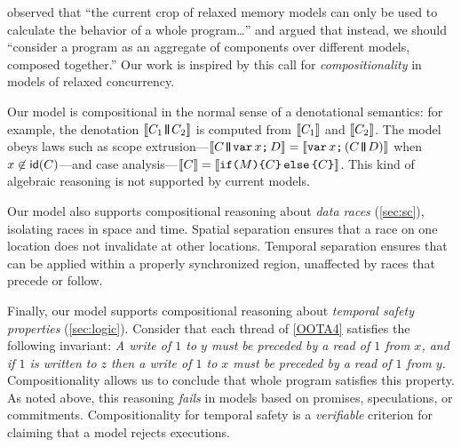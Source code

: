 \citet{Batty17} observed that ``the current crop of relaxed memory models can
only be used to calculate the behavior of a whole program\ldots'' and argued
that instead, we should ``consider a program as an aggregate of components
over different models, composed together.''  Our work is inspired by this
call for \emph{compositionality} in models of relaxed concurrency.

Our model is compositional in the normal sense of a denotational semantics:
for example, the denotation $\sem{C_1\!{\PAR}\! C_2}$ is computed from
$\llbracket C_1\rrbracket$ and $\llbracket C_2\rrbracket$.  The model obeys laws such as scope
extrusion---$\sem{\aCmd\!{\PAR}\! \VAR\aLoc\SEMI\bCmd} =
\sem{\VAR\aLoc\SEMI(\aCmd\!{\PAR}\!\bCmd)}$ when $x\not\in\mathsf{id}(C)$---and
case analysis---$\llbracket C\rrbracket = \llbracket\texttt{if}\allowbreak\texttt{(}M\texttt{)}\allowbreak\texttt{\{}C\texttt{\}}\,\allowbreak\texttt{else}\allowbreak\,\texttt{\{}C\texttt{\}}\rrbracket$.
This kind of algebraic reasoning is not supported by current models.

Our model also supports compositional reasoning about \emph{data races}
(\textsection\ref{sec:sc}), isolating races in space and time.  Spatial
separation ensures that a race on one location does not invalidate \drfsc{}
at other locations.  Temporal separation ensures that \drfsc{} can be applied
within a properly synchronized region, unaffected by races that precede or
follow.

Finally, our model supports compositional reasoning about \emph{temporal
  safety properties} (\textsection\ref{sec:logic}).  Consider that each
thread of \ref{OOTA4} satisfies the following invariant: \emph{A write of $1$
  to $y$ must be preceded by a read of $1$ from $x$, and if $1$ is written to
  $z$ then a write of $1$ to $x$ must be preceded by a read of $1$ from $y$.}
Compositionality allows us to conclude that whole program satisfies this
property.  As noted above, this reasoning \emph{fails} in models based on
promises, speculations, or commitments.
Compositionality for temporal safety is a \emph{verifiable} criterion for claiming that a model
rejects \oota{} executions.




